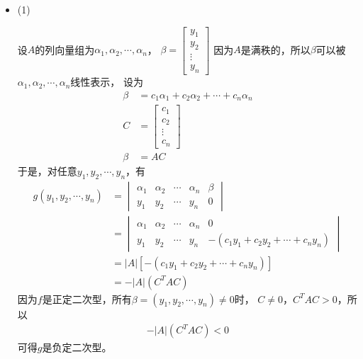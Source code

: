 \documentclass{article}
\begin{document}
\begin{itemize}
  \item (1)

        设$A$的列向量组为$\alpha_1, \alpha_2, \cdots, \alpha_n$，
        $\beta = \begin{bmatrix}
            y_1    \\
            y_2    \\
            \vdots \\
            y_n
          \end{bmatrix}$
        因为$A$是满秩的，所以$\beta$可以被$\alpha_1, \alpha_2, \cdots, \alpha_n$线性表示，
        设为
        \begin{align*}
          \beta & = c_1 \alpha_1 + c_2 \alpha_2 + \cdots + c_n \alpha_n \\
          C     & = \begin{bmatrix}
                      c_1    \\
                      c_2    \\
                      \vdots \\
                      c_n
                    \end{bmatrix}                                      \\
          \beta & = A C
        \end{align*}
        于是，对任意$y_1, y_2, \cdots, y_n$，有
        \begin{align*}
          g(y_1, y_2, \cdots, y_n) & = \begin{vmatrix}
                                         \alpha_1 & \alpha_2 & \cdots & \alpha_n & \beta \\
                                         y_1      & y_2      & \cdots & y_n      & 0
                                       \end{vmatrix}                                  \\
                                   & =\begin{vmatrix}
                                        \alpha_1 & \alpha_2 & \cdots & \alpha_n & 0                                       \\
                                        y_1      & y_2      & \cdots & y_n      & -(c_1 y_1 + c_2 y_2 + \cdots + c_n y_n)
                                      \end{vmatrix} \\
                                   & = |A|[-(c_1 y_1 + c_2 y_2 + \cdots + c_n y_n)]                                     \\
                                   & = - |A| (C^T A C)
        \end{align*}
        因为$f$是正定二次型，所有$\beta = (y_1, y_2, \cdots, y_n)\neq 0$时，
        $C \neq 0$，$C^T A C > 0$，所以
        \begin{align*}
          - |A| (C^T A C) < 0
        \end{align*}
        可得$g$是负定二次型。


\end{itemize}
\end{document}
